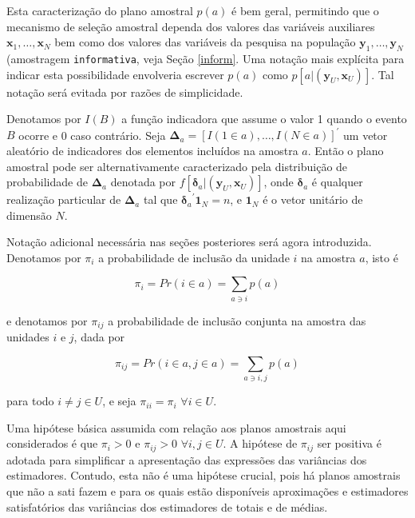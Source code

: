 \documentclass[]{book}
\theoremstyle{definition}
\theoremstyle{definition}
\theoremstyle{definition}
\theoremstyle{remark}
\begin{document}
Esta caracterização do plano amostral \(p(a)\) é bem geral, permitindo
que o mecanismo de seleção amostral dependa dos valores das variáveis
auxiliares \(\mathbf{x}_1 ,\ldots, \mathbf{x}_N\) bem como dos valores
das variáveis da pesquisa na população
\(\mathbf{y}_1 ,\ldots, \mathbf{y}_N\) (amostragem \texttt{informativa},
veja Seção \ref{inform}. Uma notação mais explícita para indicar esta
possibilidade envolveria escrever \(p(a)\) como
\(p\left[ a | (\mathbf{y}_U , \mathbf{x}_U ) \right]\). Tal notação será
evitada por razões de simplicidade.

Denotamos por \(I(B)\) a função indicadora que assume o valor 1 quando o
evento \(B\) ocorre e 0 caso contrário. Seja
\(\mathbf{\Delta}_a = \left[ I(1 \in a) ,\ldots, I(N \in a)\right]^{\prime}\)
um vetor aleatório de indicadores dos elementos incluídos na amostra
\(a\). Então o plano amostral pode ser alternativamente caracterizado
pela distribuição de probabilidade de \(\mathbf{\Delta }_a\) denotada
por
\(f\left[ \mathbf{\delta }_a | \left(\mathbf{y}_U , \mathbf{x}_U \right) \right]\),
onde \(\mathbf{\delta }_a\) é qualquer realização particular de
\(\mathbf{\Delta }_a\) tal que
\({\mathbf{\delta}_a}^{\prime} \mathbf{1}_N = n\), e \(\mathbf{1}_N\) é
o vetor unitário de dimensão \(N\).

Notação adicional necessária nas seções posteriores será agora
introduzida. Denotamos por \(\pi_i\) a probabilidade de inclusão da
unidade \(i\) na amostra \(a\), isto é

\begin{equation}
\pi_i = Pr\left( i \in a \right) = \sum_{a \ni i} p(a)  \label{eq:ref5}
\end{equation}

e denotamos por \(\pi_{ij}\) a probabilidade de inclusão conjunta na
amostra das unidades \(i\) e \(j\), dada por

\begin{equation}
\pi_{ij} = Pr \left( i \in a , j \in a \right) = \sum_{a \ni i,j} p(a) \label{eq:ref6}
\end{equation}

para todo \(i \neq j \in U\), e seja \(\pi_{ii} = \pi_{i}\)
\(\forall i \in U.\)

Uma hipótese básica assumida com relação aos planos amostrais aqui
considerados é que \(\pi_i > 0\) e \(\pi_{ij} > 0\)
\(\forall i,j \in U.\) A hipótese de \(\pi_{ij}\) ser positiva é adotada
para simplificar a apresentação das expressões das variâncias dos
estimadores. Contudo, esta não é uma hipótese crucial, pois há planos
amostrais que não a sati fazem e para os quais estão disponíveis
aproximações e estimadores satisfatórios das variâncias dos estimadores
de totais e de médias.
\end{document}
